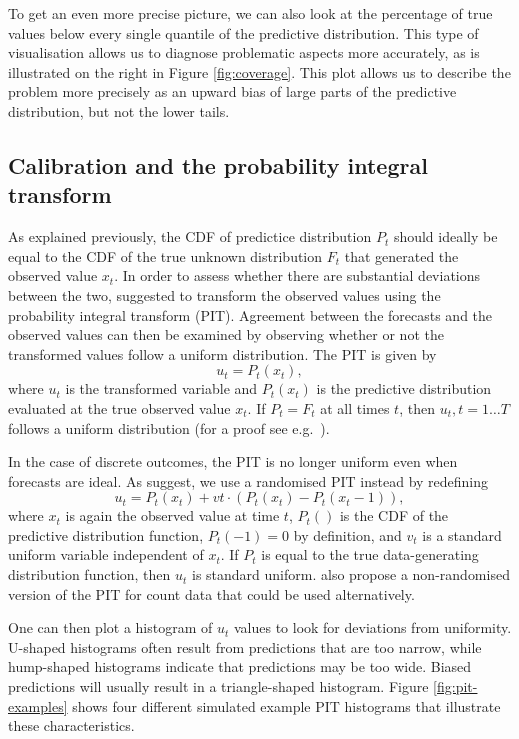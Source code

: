 \documentclass[
]{book}
\begin{document}
To get an even more precise picture, we can also look at the percentage of true values below every single quantile of the predictive distribution. This type of visualisation allows us to diagnose problematic aspects more accurately, as is illustrated on the right in Figure \ref{fig:coverage}. This plot allows us to describe the problem more precisely as an upward bias of large parts of the predictive distribution, but not the lower tails.

\hypertarget{calibration-and-the-probability-integral-transform}{%
\subsection{Calibration and the probability integral transform}\label{calibration-and-the-probability-integral-transform}}

As explained previously, the CDF of predictice distribution \(P_t\) should ideally be equal to the CDF of the true unknown distribution \(F_t\) that generated the observed value \(x_t\). In order to assess whether there are substantial deviations between the two, \citet{dawidPresentPositionPotential1984} suggested to transform the observed values using the probability integral transform (PIT). Agreement between the forecasts and the observed values can then be examined by observing whether or not the transformed values follow a uniform distribution. The PIT is given by
\[u_t = P_t (x_t),\]
where \(u_t\) is the transformed variable and \(P_t(x_t)\) is the predictive distribution evaluated at the true observed value \(x_t\). If \(P_t = F_t\) at all times \(t\), then \(u_t, t = 1 \dots T\) follows a uniform distribution (for a proof see e.g.~\citet{angusProbabilityIntegralTransform1994}).

In the case of discrete outcomes, the PIT is no longer uniform even when forecasts are ideal. As \citet{funkAssessingPerformanceRealtime2019} suggest, we use a randomised PIT instead by redefining
\[u_t = P_t(x_t) + vt \cdot (P_t(x_t) - P_t(x_t - 1) ),\]
where \(x_t\) is again the observed value at time \(t\), \(P_t()\) is the CDF of the predictive distribution function, \(P_t (-1) = 0\) by definition, and \(v_t\) is a standard uniform variable independent of \(x_t\). If \(P_t\) is equal to the true data-generating distribution function, then \(u_t\) is standard uniform. \citet{czadoPredictiveModelAssessment2009} also propose a non-randomised version of the PIT for count data that could be used alternatively.

One can then plot a histogram of \(u_t\) values to look for deviations from uniformity. U-shaped histograms often result from predictions that are too narrow, while hump-shaped histograms indicate that predictions may be too wide. Biased predictions will usually result in a triangle-shaped histogram. Figure \ref{fig:pit-examples} shows four different simulated example PIT histograms that illustrate these characteristics.
\end{document}
